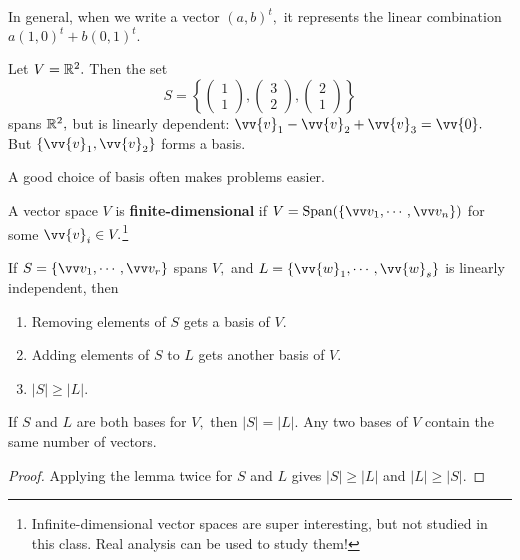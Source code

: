 In general, when we write a vector $(a, b)^t,$ it represents the linear combination $a(1, 0)^t + b(0, 1)^t.$ 

\begin{example}
Let $V = \mathbb R^2.$ Then the set 
\[
S = \left\{
\begin{pmatrix}
1 \\
1
\end{pmatrix}, \begin{pmatrix}
3 \\
2
\end{pmatrix},
\begin{pmatrix}
2 \\
1
\end{pmatrix}\right\}
\]
spans $\mathbb R^2,$ but is linearly dependent: $\vv{v}_1 - \vv{v}_2 + \vv{v}_3 = \vv{0}.$ But $\{\vv{v}_1, \vv{v}_2\}$ forms a basis. 
\end{example}

A good choice of basis often makes problems easier. 

\begin{definition}
A vector space $V$ is \textbf{finite-dimensional} if $V = \spann(\{\vvv_1, \cdots, \vvv_n\})$ for some $\vv{v}_i \in V.$\footnote{Infinite-dimensional vector spaces are super interesting, but not studied in this class. Real analysis can be used to study them!}

\end{definition}

\begin{lemma}
\label{spanlemma}
If $S = \{\vvv_1, \cdots, \vvv_r\}$ spans $V,$ and $L = \{\vv{w}_1, \cdots, \vv{w}_s\}$ is linearly independent, then 
\begin{enumerate}
    \item Removing elements of $S$ gets a basis of $V.$ 
    \item Adding elements of $S$ to $L$ gets another basis of $V.$
    \item $|S| \geq |L|$.
\end{enumerate}
\end{lemma}

\begin{corollary}
If $S$ and $L$ are both bases for $V,$ then $|S| = |L|.$ Any two bases of $V$ contain the same number of vectors.
\end{corollary}

\begin{proof}
Applying the lemma twice for $S$ and $L$ gives $|S| \geq |L|$ and $|L| \geq |S|.$
\end{proof}

